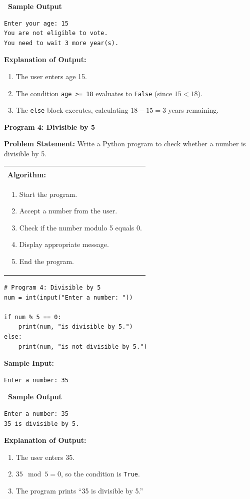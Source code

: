 \documentclass[12pt,a4paper]{article}
\makeatletter
\newcommand{\outhead}{\noindent\colorbox{cmrgreen!25}%
  {\textbf{\small\color{cmrdark}~Sample Output~}}\par\vspace{-1pt}}
\newenvironment{algobox}{%
  \par\vspace{4pt}%
  \noindent\begin{tabular}{@{}p{\linewidth}@{}}%
  \hline\\[-8pt]%
  \textbf{\color{blue!60!black}\small Algorithm:}\\[2pt]%
}{%
  \\[-4pt]\hline%
  \end{tabular}\par\vspace{4pt}%
}
\makeatother
\begin{document}
\outhead
\begin{lstlisting}[style=outputstyle]
Enter your age: 15
You are not eligible to vote.
You need to wait 3 more year(s).
\end{lstlisting}

\textbf{Explanation of Output:}
\begin{enumerate}
  \item The user enters age 15.
  \item The condition \texttt{age >= 18} evaluates to \texttt{False} (since $15 < 18$).
  \item The \texttt{else} block executes, calculating $18 - 15 = 3$ years remaining.
\end{enumerate}

\vspace{0.5cm}

\textbf{Program 4: Divisible by 5}

\textbf{Problem Statement:}
Write a Python program to check whether a number is divisible by 5.

\begin{algobox}
\begin{enumerate}[label=Step \arabic*:]
  \item Start the program.
  \item Accept a number from the user.
  \item Check if the number modulo 5 equals 0.
  \item Display appropriate message.
  \item End the program.
\end{enumerate}
\end{algobox}

\begin{lstlisting}
# Program 4: Divisible by 5
num = int(input("Enter a number: "))

if num % 5 == 0:
    print(num, "is divisible by 5.")
else:
    print(num, "is not divisible by 5.")
\end{lstlisting}

\textbf{Sample Input:}
\begin{verbatim}
Enter a number: 35
\end{verbatim}

\outhead
\begin{lstlisting}[style=outputstyle]
Enter a number: 35
35 is divisible by 5.
\end{lstlisting}

\textbf{Explanation of Output:}
\begin{enumerate}
  \item The user enters 35.
  \item $35 \mod 5 = 0$, so the condition is \texttt{True}.
  \item The program prints ``35 is divisible by 5.''
\end{enumerate}
\end{document}
